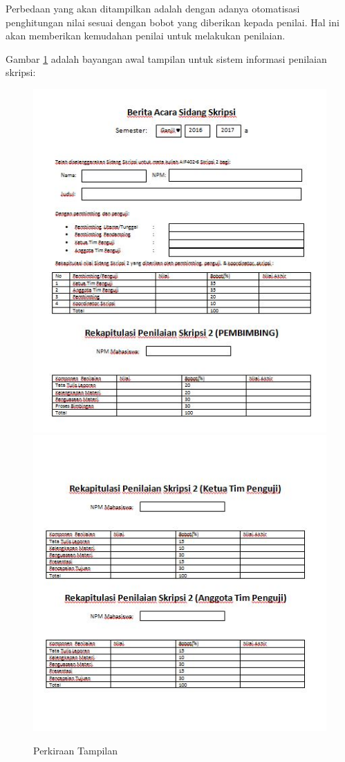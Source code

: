 	Perbedaan yang akan ditampilkan adalah dengan adanya otomatisasi penghitungan nilai sesuai dengan bobot yang diberikan kepada penilai. Hal ini akan memberikan kemudahan penilai untuk melakukan penilaian.
	
	Gambar \ref{fig:tampilan} adalah bayangan awal tampilan untuk sistem informasi penilaian skripsi:
	\begin{figure}[H]
		\centering
		\includegraphics[scale=0.75]{Gambar/tampilan1}
		\includegraphics[scale=0.75]{Gambar/tampilan2}
		\caption{Perkiraan Tampilan}
		\label{fig:tampilan}
	\end{figure}
	
